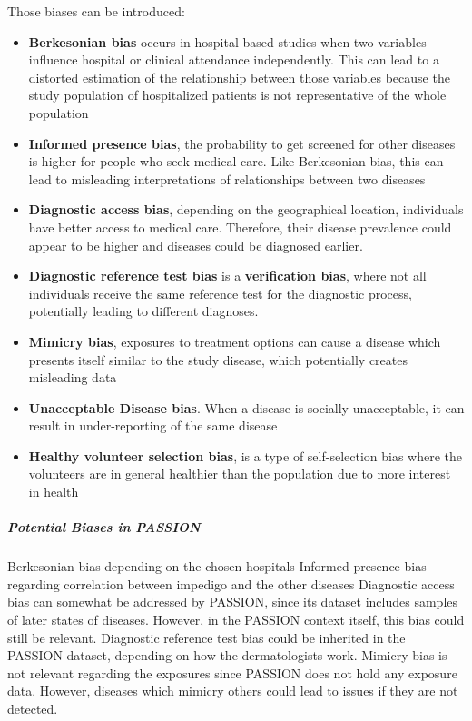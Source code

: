 \begin{refsection}
		Those biases can be introduced:
		\begin{itemize}
			\item \textbf{Berkesonian bias} occurs in hospital-based studies when two variables influence hospital or clinical attendance independently. This can lead to a distorted estimation of the relationship between those variables because the study population of hospitalized patients is not representative of the whole population \autocite{Chakraborty_2024, c3, c7}
			\item \textbf{Informed presence bias}, the probability to get screened for other diseases is higher for people who seek medical care. Like Berkesonian bias, this can lead to misleading interpretations of relationships between two diseases \autocite{Chakraborty_2024, c27, c23}
			\item \textbf{Diagnostic access bias}, depending on the geographical location, individuals have better access to medical care. Therefore, their disease prevalence could appear to be higher and diseases could be diagnosed earlier. \autocite{Chakraborty_2024, c19-c21}
			\item \textbf{Diagnostic reference test bias} is a \textbf{verification bias}, where not all individuals receive the same reference test for the diagnostic process, potentially leading to different diagnoses. \autocite{Chakraborty_2024, c21}
			\item \textbf{Mimicry bias}, exposures to treatment options can cause a disease which presents itself similar to the study disease, which potentially creates misleading data \autocite{Chakraborty_2024, c28, c25}
			\item \textbf{Unacceptable Disease bias}. When a disease is socially unacceptable, it can result in under-reporting of the same disease \autocite{Chakraborty_2024, c30, c27}
			\item \textbf{Healthy volunteer selection bias}, is a type of self-selection bias where the volunteers are in general healthier than the population due to more interest in health \autocite{Delgado-Rodriguez_2004}
		\end{itemize}
		
		\subparagraph{Potential Biases in PASSION}
		Berkesonian bias depending on the chosen hospitals
		Informed presence bias regarding correlation between impedigo and the other diseases
		Diagnostic access bias can somewhat be addressed by PASSION, since its dataset includes samples of later states of diseases. However, in the PASSION context itself, this bias could still be relevant.
		Diagnostic reference test bias could be inherited in the PASSION dataset, depending on how the dermatologists work.
		Mimicry bias is not relevant regarding the exposures since PASSION does not hold any exposure data. However, diseases which mimicry others could lead to issues if they are not detected.
		

\end{refsection}
